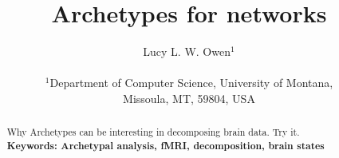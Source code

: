\documentclass[12pt]{article}
\title{Archetypes for networks}
\author
{Lucy L. W. Owen$^{1}$\\
\\
\normalsize{$^{1}$Department of Computer Science,
  University of Montana,}\\
\normalsize{Missoula, MT, 59804, USA}
}
\date{}
\begin{document}
 


\baselineskip24pt


\maketitle 

\begin{abstract}
Why Archetypes can be interesting in decomposing brain data.  Try it.\\

\small{\textbf{Keywords: Archetypal analysis, fMRI, decomposition, brain states}}
\end{abstract}



\end{document}
